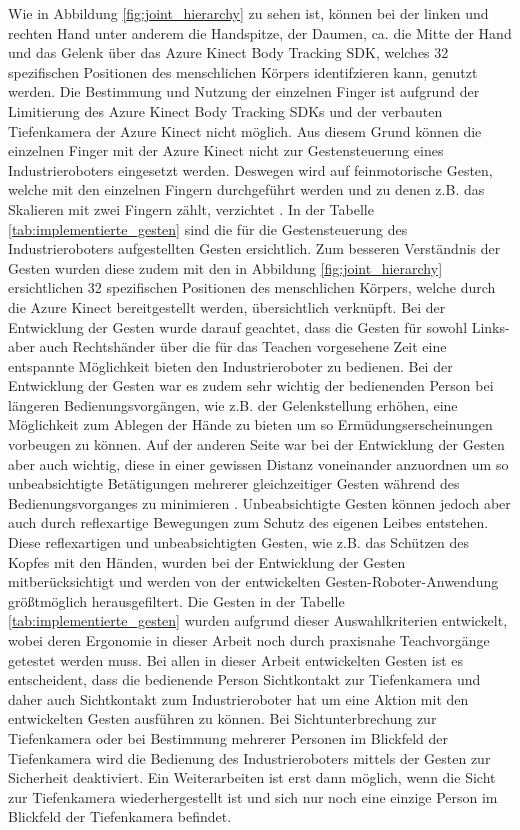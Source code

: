 Wie in Abbildung \ref{fig:joint_hierarchy} zu sehen ist, können bei der linken und rechten Hand unter anderem die Handspitze, der Daumen, ca. die Mitte der Hand und das Gelenk über das Azure Kinect Body Tracking SDK, welches 32 spezifischen Positionen des menschlichen Körpers identifzieren kann, genutzt werden. Die Bestimmung und Nutzung der einzelnen Finger ist aufgrund der Limitierung des Azure Kinect Body Tracking SDKs und der verbauten Tiefenkamera der Azure Kinect nicht möglich. Aus diesem Grund können die einzelnen Finger mit der Azure Kinect nicht zur Gestensteuerung eines Industrieroboters eingesetzt werden. Deswegen wird auf feinmotorische Gesten, welche mit den einzelnen Fingern durchgeführt werden und zu denen z.B. das Skalieren mit zwei Fingern zählt, verzichtet \cite{qm13_azure_joints_nodate}. In der Tabelle \ref{tab:implementierte_gesten} sind die für die Gestensteuerung des Industrieroboters aufgestellten Gesten ersichtlich. Zum besseren Verständnis der Gesten wurden diese zudem mit den in Abbildung \ref{fig:joint_hierarchy} ersichtlichen 32 spezifischen Positionen des menschlichen Körpers, welche durch die Azure Kinect bereitgestellt werden, übersichtlich verknüpft. Bei der Entwicklung der Gesten wurde darauf geachtet, dass die Gesten für sowohl Links- aber auch Rechtshänder über die für das Teachen vorgesehene Zeit eine entspannte Möglichkeit bieten den Industrieroboter zu bedienen. Bei der Entwicklung der Gesten war es zudem sehr wichtig der bedienenden Person bei längeren Bedienungsvorgängen, wie z.B. der Gelenkstellung erhöhen, eine Möglichkeit zum Ablegen der Hände zu bieten um so Ermüdungserscheinungen vorbeugen zu können. Auf der anderen Seite war bei der Entwicklung der Gesten aber auch wichtig, diese in einer gewissen Distanz voneinander anzuordnen um so unbeabsichtigte Betätigungen mehrerer gleichzeitiger Gesten während des Bedienungsvorganges zu minimieren \cite{proff_radikale_2013}. Unbeabsichtigte Gesten können jedoch aber auch durch reflexartige Bewegungen zum Schutz des eigenen Leibes entstehen. Diese reflexartigen und unbeabsichtigten Gesten, wie z.B. das Schützen des Kopfes mit den Händen, \cite[95]{matschnig_korpersprache_2007} wurden bei der Entwicklung der Gesten mitberücksichtigt und werden von der entwickelten Gesten-Roboter-Anwendung größtmöglich herausgefiltert. Die Gesten in der Tabelle \ref{tab:implementierte_gesten} wurden aufgrund dieser Auswahlkriterien entwickelt, wobei deren Ergonomie in dieser Arbeit noch durch praxisnahe Teachvorgänge getestet werden muss. Bei allen in dieser Arbeit entwickelten Gesten ist es entscheident, dass die bedienende Person Sichtkontakt zur Tiefenkamera und daher auch Sichtkontakt zum Industrieroboter hat um eine Aktion mit den entwickelten Gesten ausführen zu können. Bei Sichtunterbrechung zur Tiefenkamera oder bei Bestimmung mehrerer Personen im Blickfeld der Tiefenkamera wird die Bedienung des Industrieroboters mittels der Gesten zur Sicherheit deaktiviert. Ein Weiterarbeiten ist erst dann möglich, wenn die Sicht zur Tiefenkamera wiederhergestellt ist und sich nur noch eine einzige Person im Blickfeld der Tiefenkamera befindet.\newline

